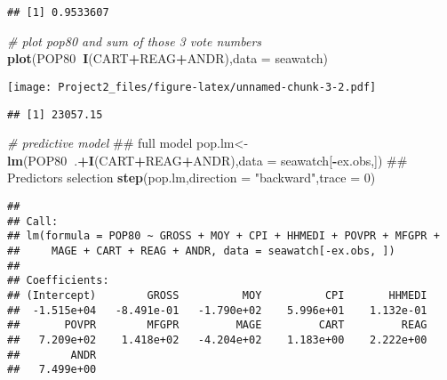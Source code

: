 \documentclass[]{article}
\newenvironment{Shaded}{\begin{snugshade}}{\end{snugshade}}
\newcommand{\KeywordTok}[1]{\textcolor[rgb]{0.13,0.29,0.53}{\textbf{#1}}}
\newcommand{\DataTypeTok}[1]{\textcolor[rgb]{0.13,0.29,0.53}{#1}}
\newcommand{\DecValTok}[1]{\textcolor[rgb]{0.00,0.00,0.81}{#1}}
\newcommand{\StringTok}[1]{\textcolor[rgb]{0.31,0.60,0.02}{#1}}
\newcommand{\CommentTok}[1]{\textcolor[rgb]{0.56,0.35,0.01}{\textit{#1}}}
\newcommand{\OperatorTok}[1]{\textcolor[rgb]{0.81,0.36,0.00}{\textbf{#1}}}
\newcommand{\NormalTok}[1]{#1}
\begin{document}
\begin{verbatim}
## [1] 0.9533607
\end{verbatim}

\begin{Shaded}
\begin{Highlighting}[]
\CommentTok{# plot pop80 and sum of those 3 vote numbers}
\KeywordTok{plot}\NormalTok{(POP80}\OperatorTok{~}\KeywordTok{I}\NormalTok{(CART}\OperatorTok{+}\NormalTok{REAG}\OperatorTok{+}\NormalTok{ANDR),}\DataTypeTok{data =}\NormalTok{ seawatch)}
\end{Highlighting}
\end{Shaded}

\texttt{[image: Project2\_files/figure-latex/unnamed-chunk-3-2.pdf]}

\begin{Shaded}
\end{Shaded}

\begin{verbatim}
## [1] 23057.15
\end{verbatim}

\begin{Shaded}
\begin{Highlighting}[]
\CommentTok{# predictive model}
\NormalTok{## full model}
\NormalTok{pop.lm<-}\KeywordTok{lm}\NormalTok{(POP80}\OperatorTok{~}\NormalTok{.}\OperatorTok{+}\KeywordTok{I}\NormalTok{(CART}\OperatorTok{+}\NormalTok{REAG}\OperatorTok{+}\NormalTok{ANDR),}\DataTypeTok{data =}\NormalTok{ seawatch[}\OperatorTok{-}\NormalTok{ex.obs,])}
\NormalTok{## Predictors selection}
\KeywordTok{step}\NormalTok{(pop.lm,}\DataTypeTok{direction =} \StringTok{"backward"}\NormalTok{,}\DataTypeTok{trace =} \DecValTok{0}\NormalTok{)}
\end{Highlighting}
\end{Shaded}

\begin{verbatim}
## 
## Call:
## lm(formula = POP80 ~ GROSS + MOY + CPI + HHMEDI + POVPR + MFGPR + 
##     MAGE + CART + REAG + ANDR, data = seawatch[-ex.obs, ])
## 
## Coefficients:
## (Intercept)        GROSS          MOY          CPI       HHMEDI  
##  -1.515e+04   -8.491e-01   -1.790e+02    5.996e+01    1.132e-01  
##       POVPR        MFGPR         MAGE         CART         REAG  
##   7.209e+02    1.418e+02   -4.204e+02    1.183e+00    2.222e+00  
##        ANDR  
##   7.499e+00
\end{verbatim}
\end{document}
